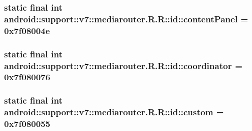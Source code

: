 \hypertarget{classandroid_1_1support_1_1v7_1_1mediarouter_1_1_r_1_1id_38aa7cae5d3aabbfd838809cea682c3b}{
\subsubsection[{contentPanel}]{\setlength{\rightskip}{0pt plus 5cm}static final int android::support::v7::mediarouter.R.R::id::contentPanel = 0x7f08004e}}
\label{classandroid_1_1support_1_1v7_1_1mediarouter_1_1_r_1_1id_38aa7cae5d3aabbfd838809cea682c3b}


\hypertarget{classandroid_1_1support_1_1v7_1_1mediarouter_1_1_r_1_1id_d833df1dbe9b9587914e8318923f4b94}{
\subsubsection[{coordinator}]{\setlength{\rightskip}{0pt plus 5cm}static final int android::support::v7::mediarouter.R.R::id::coordinator = 0x7f080076}}
\label{classandroid_1_1support_1_1v7_1_1mediarouter_1_1_r_1_1id_d833df1dbe9b9587914e8318923f4b94}


\hypertarget{classandroid_1_1support_1_1v7_1_1mediarouter_1_1_r_1_1id_67017af2d649682b5d5c943d5a6aa216}{
\subsubsection[{custom}]{\setlength{\rightskip}{0pt plus 5cm}static final int android::support::v7::mediarouter.R.R::id::custom = 0x7f080055}}
\label{classandroid_1_1support_1_1v7_1_1mediarouter_1_1_r_1_1id_67017af2d649682b5d5c943d5a6aa216}


